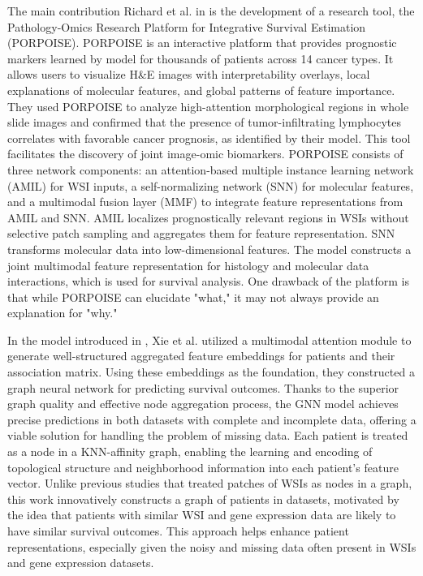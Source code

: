 \documentclass[journal,twoside,web]{ieeecolor}
\begin{document}
The main contribution Richard et al. in \cite{chen2022pan} is the development of a research tool, the Pathology-Omics Research Platform for Integrative Survival Estimation (PORPOISE). 
PORPOISE is an interactive platform that provides prognostic markers learned by model for thousands of patients across 14 cancer types. 
It allows users to visualize H\&E images with interpretability overlays, local explanations of molecular features, and global patterns of feature importance. 
They used PORPOISE to analyze high-attention morphological regions in whole slide images and confirmed that the presence of tumor-infiltrating lymphocytes correlates with favorable cancer prognosis, as identified by their model. 
This tool facilitates the discovery of joint image-omic biomarkers.
PORPOISE consists of three network components: an attention-based multiple instance learning network (AMIL) for WSI inputs, a self-normalizing network (SNN) for molecular features, and a multimodal fusion layer (MMF) to integrate feature representations from AMIL and SNN.  
AMIL localizes prognostically relevant regions in WSIs without selective patch sampling and aggregates them for feature representation.  
SNN transforms molecular data into low-dimensional features.  
The model constructs a joint multimodal feature representation for histology and molecular data interactions, which is used for survival analysis.
One drawback of the platform is that while PORPOISE can elucidate "what," it may not always provide an explanation for "why."

In the model introduced in \cite{xie2022survival}, Xie et al. utilized a multimodal attention module to generate well-structured aggregated feature embeddings for patients and their association matrix. 
Using these embeddings as the foundation, they constructed a graph neural network for predicting survival outcomes.  
Thanks to the superior graph quality and effective node aggregation process, the GNN model achieves precise predictions in both datasets with complete and incomplete data, offering a viable solution for handling the problem of missing data.
Each patient is treated as a node in a KNN-affinity graph, enabling the learning and encoding of topological structure and neighborhood information into each patient's feature vector.  
Unlike previous studies that treated patches of WSIs as nodes in a graph, this work innovatively constructs a graph of patients in datasets, motivated by the idea that patients with similar WSI and gene expression data are likely to have similar survival outcomes.  
This approach helps enhance patient representations, especially given the noisy and missing data often present in WSIs and gene expression datasets.
\end{document}
